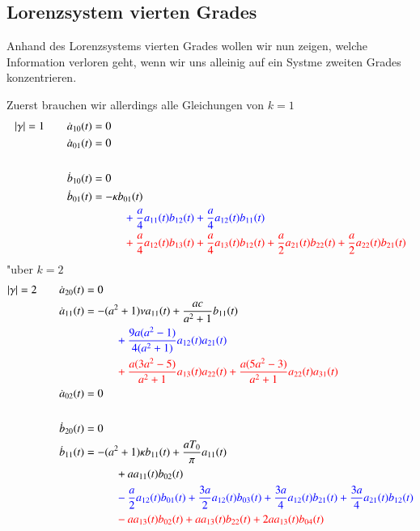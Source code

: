 \begin{refsection}
\section{Lorenzsystem vierten Grades}
Anhand des Lorenzsystems vierten Grades wollen wir nun zeigen, welche 
Information verloren geht, wenn wir uns alleinig auf ein Systme zweiten Grades 
konzentrieren.

Zuerst brauchen wir allerdings alle Gleichungen von $k = 1$
\begin{align*}
|\gamma| = 1
\qquad &
\dot{a}_{10}(t) = 0
\\
&
\dot{a}_{01}(t) = 0
\\
\\
&
\dot{b}_{10}(t) = 0
\\
&
\dot{b}_{01}(t)
=
-
\kappa
b_{01}(t)
\\
&\phantom{aaaaaaaaaa}
\color{blue}
+
\frac{a}{4} a_{11}(t) b_{12}(t)
+
\frac{a}{4} a_{12}(t) b_{11}(t)
\\
&\phantom{aaaaaaaaaa}
\color{red}
+
\frac{a}{4} a_{12}(t) b_{13}(t)
+
\frac{a}{4} a_{13}(t) b_{12}(t)
+
\frac{a}{2} a_{21}(t) b_{22}(t)
+
\frac{a}{2} a_{22}(t) b_{21}(t)
\end{align*}
"uber $k = 2$
\begin{align*}
|\gamma| = 2
\qquad &
\dot{a}_{20}(t) = 0
\\
&
\dot{a}_{11}(t)
=
-
(a^2+1)
\nu
a_{11}(t)
+
\frac{a c}{a^2+1} b_{11}(t)
\\
&\phantom{aaaaaaaaaa}
\color{blue}
+
\frac{9 a (a^2 - 1)}{4 (a^2+1)} a_{12}(t) a_{21}(t)
\\
&\phantom{aaaaaaaaaa}
\color{red}
+
\frac{a (3 a^2 - 5)}{a^2+1} a_{13}(t) a_{22}(t)
+
\frac{a (5 a^2 - 3)}{a^2+1} a_{22}(t) a_{31}(t)
\\
&
\dot{a}_{02}(t) = 0
\\
\\
&
\dot{b}_{20}(t) = 0
\\
&
\dot{b}_{11}(t)
=
-
(a^2+1)
\kappa
b_{11}(t)
+
\frac{a T_{0}}{\pi} a_{11}(t)
\\
&\phantom{aaaaaaaaaa}
+
a
a_{11}(t) b_{02}(t)
\\
&\phantom{aaaaaaaaaa}
\color{blue}
-
\frac{a}{2} a_{12}(t) b_{01}(t)
+
\frac{3 a}{2} a_{12}(t) b_{03}(t)
+
\frac{3 a}{4} a_{12}(t) b_{21}(t)
+
\frac{3 a}{4} a_{21}(t) b_{12}(t)
\\
&\phantom{aaaaaaaaaa}
\color{red}
-
a
a_{13}(t) b_{02}(t)
+
a
a_{13}(t) b_{22}(t)
+
2 a
a_{13}(t) b_{04}(t)
\\

\end{align*}
\end{refsection}
